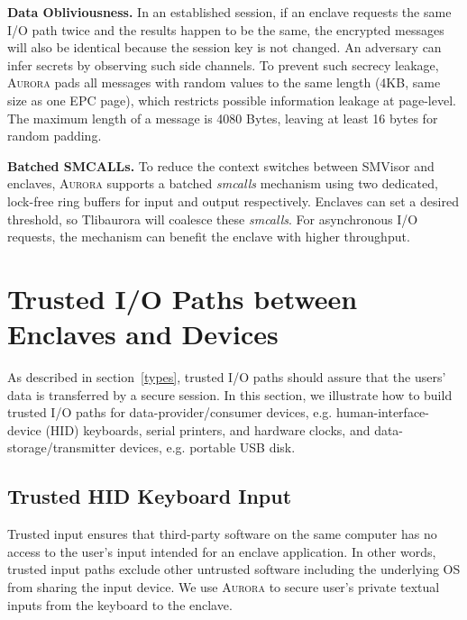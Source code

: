\documentclass[journal,twocolumn,letterpaper,10pt]{IEEEtran}
\begin{document}
\textbf{Data Obliviousness.}
In an established session, if an enclave requests the same I/O path twice and the results happen to be the same, the encrypted messages will also be identical because the session key is not changed. An adversary can infer secrets by observing such side channels. To prevent such secrecy leakage, \textsc{Aurora} pads all messages with random values to the same length (4KB, same size as one EPC page), which restricts possible information leakage at page-level. The maximum length of a message is 4080 Bytes, leaving at least 16 bytes for random padding.%

\textbf{Batched SMCALLs.}\label{batch}
To reduce the context switches between SMVisor and enclaves, \textsc{Aurora} supports a batched \textit{smcalls} mechanism using two dedicated, lock-free ring buffers for input and output respectively. %
Enclaves can set a desired threshold, so Tlibaurora will coalesce these \textit{smcalls}. For asynchronous I/O requests, the mechanism can benefit the enclave with higher throughput.


\section{Trusted I/O Paths between Enclaves and Devices}\label{tpaths}

As described in section~\autoref{types},  trusted I/O paths  should assure that the users' data is transferred by a secure session. 
In this section, we illustrate how to build trusted I/O paths for data-provider/consumer devices, e.g. human-interface-device (HID) keyboards, serial printers, and hardware clocks, and data-storage/transmitter devices, e.g. portable USB disk.

\subsection{Trusted HID Keyboard Input}\label{input_service}
Trusted input ensures that third-party software on the same computer has no access to the user's input intended for an enclave application. In other words, trusted input paths exclude other untrusted software including the underlying OS from sharing the input device. We use \textsc{Aurora} to secure user's private textual inputs from the keyboard to the enclave.%
\end{document}
